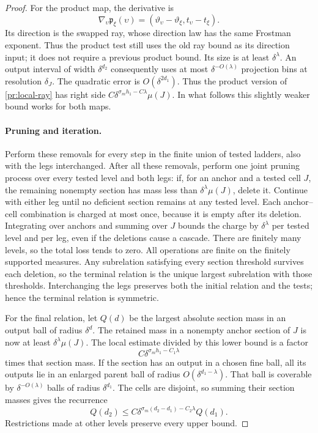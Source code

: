 \begin{proof}
For the product map, the derivative is
\begin{equation}
 \nabla_\upsilon\mathfrak p_\xi(\upsilon)
   =(\vartheta_\upsilon-\vartheta_\xi,
                         t_\upsilon-t_\xi).
\label{pr:product-gradient}
\end{equation}
Its direction is the swapped ray, whose direction law has the same
Frostman exponent. Thus the product test still uses the old ray bound
as its direction input; it does not require a previous product bound.
Its size is at least $\delta^\lambda$.
An output interval of width $\delta^{d_2}$ consequently uses at
most $\delta^{-O(\lambda)}$ projection bins at resolution
$\delta_J$. The quadratic error is $O(\delta^{2d_1})$.
Thus the product version of \eqref{pr:local-ray} has right side
$C\delta^{\sigma_mh_1-C\lambda}\mu(J)$.
In what follows this slightly weaker bound works for both maps.

\paragraph{Pruning and iteration.}
Perform these removals for every step in the finite union of tested
ladders, also with the legs interchanged. After all these removals,
perform one joint pruning process over every tested level and both
legs: if, for an anchor and a tested
cell $J$, the remaining nonempty section has mass less than
$\delta^\lambda\mu(J)$, delete it. Continue with either leg until
no deficient section remains at any tested level. Each
anchor--cell combination is charged at most once,
because it is empty after its deletion. Integrating over anchors
and summing over $J$ bounds the charge by $\delta^\lambda$ per
tested level and per leg, even if the deletions cause a cascade.
There are finitely many levels, so the total loss tends to zero.
All operations are finite on the finitely supported measures. Any
subrelation satisfying every section threshold survives each deletion,
so the terminal relation is the unique largest subrelation with those
thresholds. Interchanging the legs preserves both the initial relation
and the tests; hence the terminal relation is symmetric.

For the final relation, let $Q(d)$ be the largest absolute section
mass in an output ball of radius $\delta^d$. The retained mass in a
nonempty anchor section of $J$ is now at
least $\delta^\lambda\mu(J)$. The local estimate divided by this
lower bound is a factor
\[
 C\delta^{\sigma_mh_1-C_1\lambda}
\]
times that section mass. If the section has an output in a chosen
fine ball, all its outputs lie in an enlarged parent ball of radius
$O(\delta^{d_1-\lambda})$. That ball is coverable by
$\delta^{-O(\lambda)}$ balls of radius $\delta^{d_1}$.
The cells are disjoint, so summing their section masses gives the
recurrence
\begin{equation}
 Q(d_2)\le C\delta^{\sigma_m(d_2-d_1)-C_2\lambda}Q(d_1).
\label{pr:ladder-recurrence}
\end{equation}
Restrictions made at other levels preserve every upper bound.


\end{proof}
